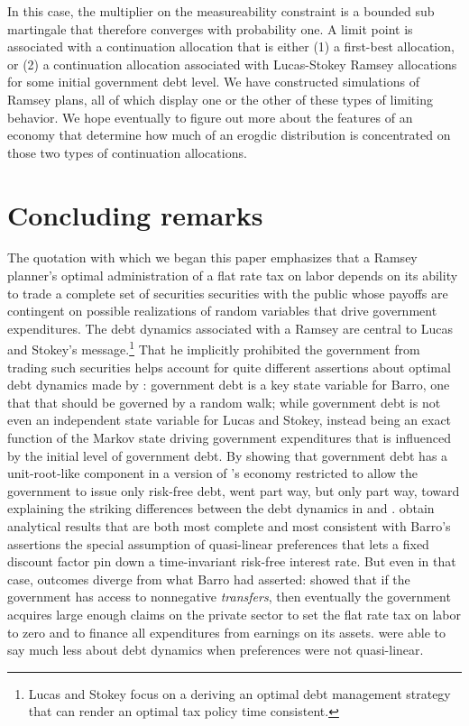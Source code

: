 \documentclass[12pt]{article}
\begin{document}
In this case, the multiplier on the measureability constraint is a bounded sub martingale that therefore converges with probability one.
A limit point is associated with a continuation allocation that is either (1) a first-best allocation, or (2) a
 continuation allocation associated with Lucas-Stokey Ramsey allocations
for some initial government debt level. We have constructed simulations  of Ramsey plans, all of which display one or the other of these types of limiting behavior.
We hope eventually  to figure out more about the features of an economy that determine how much of
an erogdic distribution is concentrated on those two types of continuation allocations.



\section{Concluding remarks}

The  \citet{LucasJr.1983} quotation  with which we began this paper emphasizes that a Ramsey planner's optimal administration of a flat rate
tax on labor depends on its ability to trade a complete set of securities securities with the public whose payoffs are contingent on
possible realizations of random variables that drive
government expenditures.  The
debt dynamics associated with a Ramsey are central to Lucas and Stokey's message.\footnote{Lucas and Stokey focus on  a deriving an optimal debt management strategy that can render an optimal tax policy time consistent.}  That he implicitly prohibited the government from trading such securities helps account for quite different
assertions about optimal debt dynamics made by \citet{Barro1979}: government debt is a key state variable for Barro, one that that should be governed by
a random walk; while government debt is not even an independent state variable for Lucas and Stokey, instead being an exact function of the Markov state driving
government expenditures that is influenced by the initial level of government debt.  By showing that government debt has a unit-root-like component
in a version
of \citeauthor{LucasJr.1983}'s economy restricted to allow the government to issue only risk-free debt, \citet{Aiyagari2002} went part way, but only part way,
toward explaining  the striking differences between the debt dynamics  in \citeauthor{LucasJr.1983} and  \citeauthor{Barro1979}.
 \citeauthor{Aiyagari2002} obtain analytical results that are both most   complete and most consistent with Barro's assertions
  the special assumption of   quasi-linear preferences that lets  a fixed discount factor pin down a time-invariant  risk-free interest rate.
  But even in that case, outcomes diverge from what Barro had asserted: \citeauthor{Aiyagari2002} showed that if the government has access to
  nonnegative {\em transfers}, then eventually the government acquires large enough claims on the private sector to set the flat rate tax on labor to zero
  and to finance all expenditures from earnings on its assets.  \citeauthor{Aiyagari2002} were able to say much less about debt dynamics when preferences were
  not quasi-linear.
\end{document}
